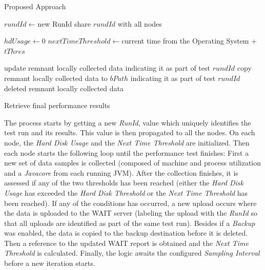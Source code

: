 \documentclass[runningheads,a4paper]{llncs}
\begin{document}
\begin{algorithm}
\caption{Proposed Approach}
\label{Proposed_Approach}
\DontPrintSemicolon
{}
\;
$rundId \gets $new RunId\;
share $rundId$ \hspace{2 mm} with all nodes\;
 {	
	$hdUsage \gets 0$\;
	$nextTimeThreshold \gets $current time from the Operating System + $tThres$\;
			
    \;
	
	\;
	update remnant locally collected data indicating it as part of test $rundId$\;
	 {
		copy remnant locally collected data to $bPath$ indicating it as part of test
		$rundId$\; 
		}
		deleted remnant locally collected data\;
  }
  Retrieve final performance results\;
\end{algorithm}

The process starts by getting a new \emph{RunId}, value which uniquely
identifies the test run and its results. This value is then propagated to all
the nodes. On each node, the \emph{Hard Disk Usage} and  the \emph{Next Time
Threshold} are initialized. Then each node starts the following
loop until the performance test finishes: First a new set of data samples is
collected (composed of machine and process utilization and a \emph{Javacore}
from each running JVM). After the collection finishes, it is assessed if any of
the two thresholds has been reached (either the \emph{Hard Disk Usage} has
exceeded the \emph{Hard Disk Threshold} or the \emph{Next Time Threshold} has
been reached). If any of the conditions has occurred, a new upload occurs where
the data is uploaded to the WAIT server (labeling the upload with the
\emph{RunId} so that all uploads are identified as part of the same test run).
Besides if a \emph{Backup} was enabled, the data is copied to the backup
destination before it is deleted. Then a reference to the updated WAIT report
is obtained and the \emph{Next Time Threshold} is calculated. Finally, the logic
awaits the configured \emph{Sampling Interval} before a new iteration starts.
\end{document}
